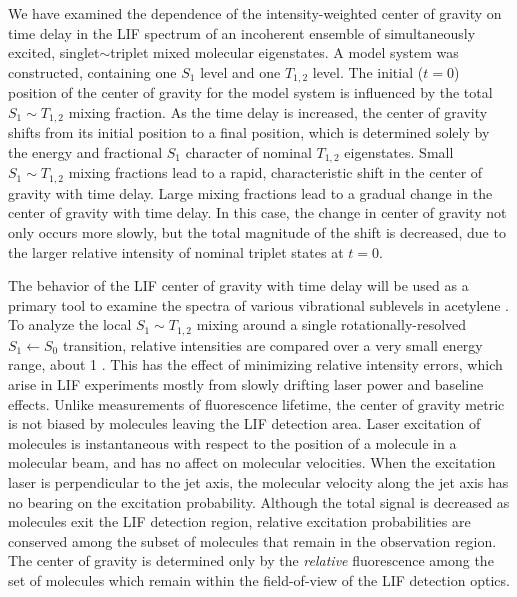 We have examined the dependence of the intensity-weighted center of
gravity on time delay in the LIF spectrum of an incoherent ensemble
of simultaneously excited, singlet$\sim$triplet mixed molecular
eigenstates.  A model system was constructed, containing one $S_1$
level and one $T_{1,2}$ level.  The initial ($t=0$) position of the
center of gravity for the model system is influenced by the total $S_1
\sim T_{1,2}$ mixing fraction.  As the time delay is increased, the
center of gravity shifts from its initial position to a final
position, which is determined solely by the energy and fractional
$S_1$ character of nominal $T_{1,2}$ eigenstates.  Small $S_1 \sim
T_{1,2}$ mixing fractions lead to a rapid, characteristic shift in the
center of gravity with time delay.  Large mixing fractions lead to a
gradual change in the center of gravity with time delay.  In this
case, the change in center of gravity not only occurs more slowly, but
the total magnitude of the shift is decreased, due to the larger
relative intensity of nominal triplet states at $t=0$.

The behavior of the LIF center of gravity with time delay will be used
as a primary tool to examine the spectra of various vibrational
sublevels in acetylene \astate.  To analyze the local $S_1 \sim
T_{1,2}$ mixing around a single rotationally-resolved $S_1 \leftarrow
S_0$ transition, relative intensities are compared over a very small
energy range, about 1 \rcm.  This has the effect of minimizing
relative intensity errors, which arise in LIF experiments mostly from
slowly drifting laser power and baseline effects.  Unlike measurements
of fluorescence lifetime, the center of gravity metric is not biased
by molecules leaving the LIF detection area.  Laser excitation of
molecules is instantaneous with respect to the position of a molecule
in a molecular beam, and has no affect on molecular velocities.  When
the excitation laser is perpendicular to the jet axis, the molecular
velocity along the jet axis has no bearing on the excitation
probability.  Although the total signal is decreased as molecules exit
the LIF detection region, relative excitation probabilities are
conserved among the subset of molecules that remain in the observation
region.  The center of gravity is determined only by the
\emph{relative} fluorescence among the set of molecules which remain
within the field-of-view of the LIF detection optics.



























